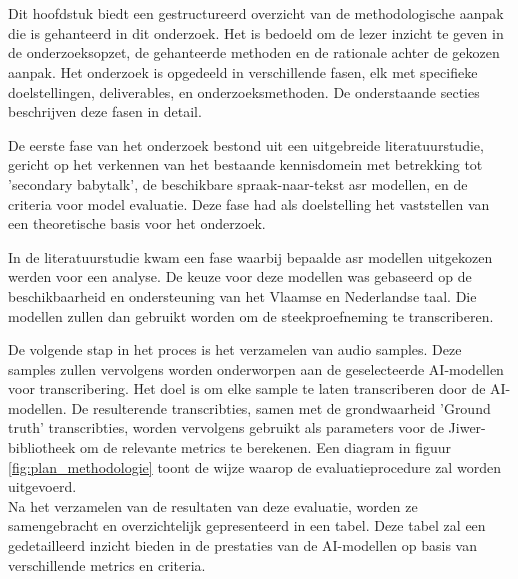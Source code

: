 
\chapter{}%
\label{ch:methodologie}

Dit hoofdstuk biedt een gestructureerd overzicht van de methodologische aanpak die is gehanteerd in dit onderzoek. Het is bedoeld om de lezer inzicht te geven in de onderzoeksopzet, de gehanteerde methoden en de rationale achter de gekozen aanpak. Het onderzoek is opgedeeld in verschillende fasen, elk met specifieke doelstellingen, deliverables, en onderzoeksmethoden. De onderstaande secties beschrijven deze fasen in detail.

De eerste fase van het onderzoek bestond uit een uitgebreide literatuurstudie, gericht op het verkennen van het bestaande kennisdomein met betrekking tot 'secondary babytalk', de beschikbare spraak-naar-tekst \gls{asr} modellen, en de criteria voor model evaluatie. Deze fase had als doelstelling het vaststellen van een theoretische basis voor het onderzoek.


In de literatuurstudie kwam een fase waarbij bepaalde \gls{asr} modellen uitgekozen werden voor een analyse. De keuze voor deze modellen was gebaseerd op de beschikbaarheid en ondersteuning van het Vlaamse en Nederlandse taal. Die modellen zullen dan gebruikt worden om de steekproefneming te transcriberen.



De volgende stap in het proces is het verzamelen van audio samples. Deze samples zullen vervolgens worden onderworpen aan de geselecteerde AI-modellen voor transcribering. Het doel is om elke sample te laten transcriberen door de AI-modellen. 
De resulterende transcribties, samen met de grondwaarheid 'Ground truth' transcribties, worden vervolgens gebruikt als parameters voor de Jiwer-bibliotheek om de relevante metrics te berekenen. Een diagram in figuur \ref{fig:plan_methodologie} toont de wijze waarop de evaluatieprocedure zal worden uitgevoerd.
\\

Na het verzamelen van de resultaten van deze evaluatie, worden ze samengebracht en overzichtelijk gepresenteerd in een tabel. Deze tabel zal een gedetailleerd inzicht bieden in de prestaties van de AI-modellen op basis van verschillende metrics en criteria. 

